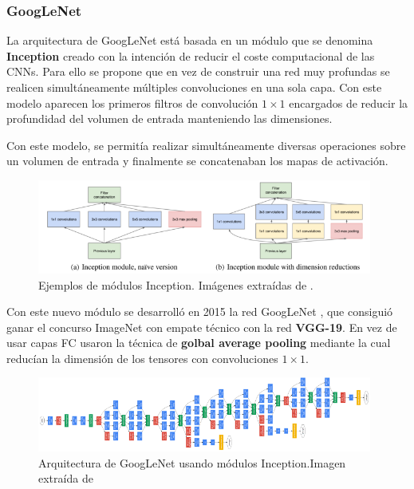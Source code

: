         \subsubsection{GoogLeNet}
            \noindent La arquitectura de GoogLeNet está basada en un módulo que se denomina \textbf{Inception} creado con la intención de reducir el coste computacional de las CNNs. Para ello se propone que en vez de construir una red muy profundas se realicen simultáneamente múltiples convoluciones en una sola capa. Con este modelo aparecen los primeros filtros de convolución $1\times 1$ encargados de reducir la profundidad del volumen de entrada manteniendo las dimensiones.

            \medskip

            \noindent Con este modelo, se permitía realizar simultáneamente diversas operaciones sobre un volumen de entrada y finalmente se concatenaban los mapas de activación.

            \begin{figure}[!h]
                \centering
                \includegraphics[width=0.98\textwidth]{img/inception_module.png}
                \caption{Ejemplos de módulos Inception. Imágenes extraídas de \cite{StanfordCourse}.}
                \label{fig:inception}
            \end{figure}

            \noindent Con este nuevo módulo se desarrolló en 2015 la red GoogLeNet \cite{szegedy2015going}, que consiguió ganar el concurso ImageNet con empate técnico con la red \textbf{VGG-19}. En vez de usar capas FC usaron la técnica de \textbf{golbal average pooling} mediante la cual reducían la dimensión de los tensores con convoluciones $1 \times 1$.

            \begin{figure}[!h]
                \centering
                \includegraphics[width=0.98\textwidth]{img/GoogLeNet.png}
                \caption{Arquitectura de GoogLeNet usando módulos Inception.Imagen extraída de \cite{StanfordCourse}}
                \label{fig:GoogLeNet}
            \end{figure}

